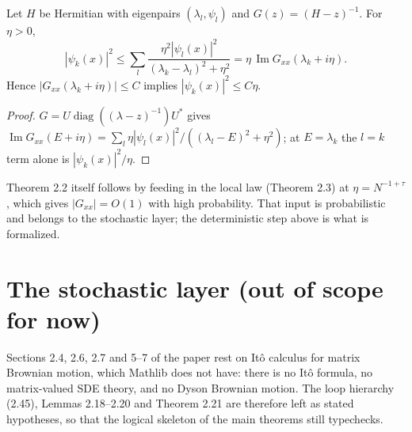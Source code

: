 \begin{lemma}\label{eq:2.10}
  \leanok
  Let $H$ be Hermitian with eigenpairs $(\lambda_l,\psi_l)$ and $G(z)=(H-z)^{-1}$.
  For $\eta>0$,
  \[ |\psi_k(x)|^2 \le \sum_l \frac{\eta^2|\psi_l(x)|^2}{(\lambda_k-\lambda_l)^2+\eta^2}
     = \eta\,\operatorname{Im} G_{xx}(\lambda_k+i\eta). \]
  Hence $|G_{xx}(\lambda_k+i\eta)|\le C$ implies $|\psi_k(x)|^2\le C\eta$.
\end{lemma}
\begin{proof}\leanok
  $G = U\operatorname{diag}((\lambda-z)^{-1})U^*$ gives
  $\operatorname{Im}G_{xx}(E+i\eta)=\sum_l \eta|\psi_l(x)|^2/((\lambda_l-E)^2+\eta^2)$;
  at $E=\lambda_k$ the $l=k$ term alone is $|\psi_k(x)|^2/\eta$.
\end{proof}

\begin{remark}\label{rem:2.2}
  Theorem 2.2 itself follows by feeding in the local law (Theorem 2.3) at
  $\eta=N^{-1+\tau}$, which gives $|G_{xx}|=O(1)$ with high probability.  That input
  is probabilistic and belongs to the stochastic layer; the deterministic step above
  is what is formalized.
\end{remark}

\chapter{The stochastic layer (out of scope for now)}

\begin{remark}\label{rem:stochastic}
  Sections 2.4, 2.6, 2.7 and 5--7 of the paper rest on It\^o calculus for matrix
  Brownian motion, which Mathlib does not have: there is no It\^o formula, no
  matrix-valued SDE theory, and no Dyson Brownian motion.  The loop hierarchy
  (2.45), Lemmas 2.18--2.20 and Theorem 2.21 are therefore left as stated
  hypotheses, so that the logical skeleton of the main theorems still typechecks.
\end{remark}
